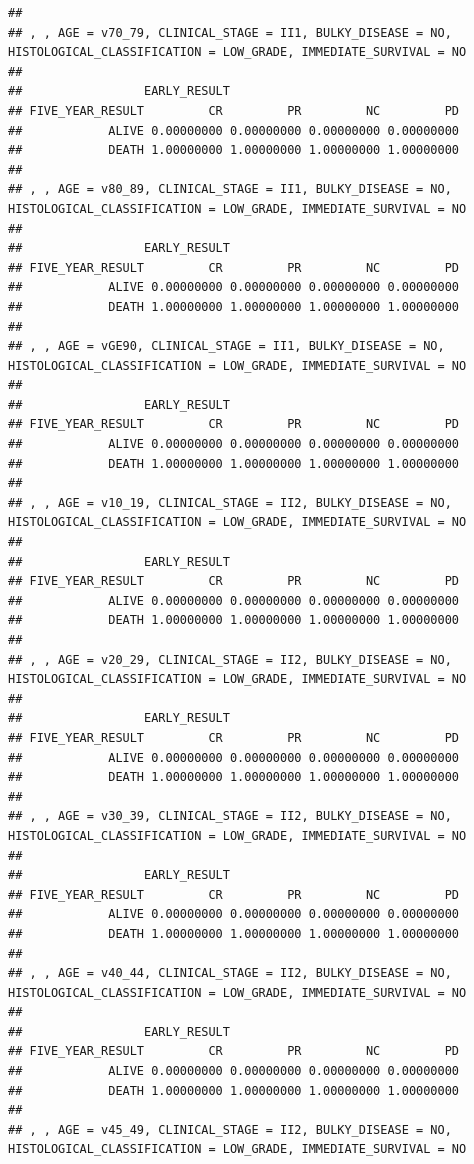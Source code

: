 \documentclass[]{article}
\begin{document}
\begin{verbatim}
## 
## , , AGE = v70_79, CLINICAL_STAGE = II1, BULKY_DISEASE = NO, HISTOLOGICAL_CLASSIFICATION = LOW_GRADE, IMMEDIATE_SURVIVAL = NO
## 
##                 EARLY_RESULT
## FIVE_YEAR_RESULT         CR         PR         NC         PD
##            ALIVE 0.00000000 0.00000000 0.00000000 0.00000000
##            DEATH 1.00000000 1.00000000 1.00000000 1.00000000
## 
## , , AGE = v80_89, CLINICAL_STAGE = II1, BULKY_DISEASE = NO, HISTOLOGICAL_CLASSIFICATION = LOW_GRADE, IMMEDIATE_SURVIVAL = NO
## 
##                 EARLY_RESULT
## FIVE_YEAR_RESULT         CR         PR         NC         PD
##            ALIVE 0.00000000 0.00000000 0.00000000 0.00000000
##            DEATH 1.00000000 1.00000000 1.00000000 1.00000000
## 
## , , AGE = vGE90, CLINICAL_STAGE = II1, BULKY_DISEASE = NO, HISTOLOGICAL_CLASSIFICATION = LOW_GRADE, IMMEDIATE_SURVIVAL = NO
## 
##                 EARLY_RESULT
## FIVE_YEAR_RESULT         CR         PR         NC         PD
##            ALIVE 0.00000000 0.00000000 0.00000000 0.00000000
##            DEATH 1.00000000 1.00000000 1.00000000 1.00000000
## 
## , , AGE = v10_19, CLINICAL_STAGE = II2, BULKY_DISEASE = NO, HISTOLOGICAL_CLASSIFICATION = LOW_GRADE, IMMEDIATE_SURVIVAL = NO
## 
##                 EARLY_RESULT
## FIVE_YEAR_RESULT         CR         PR         NC         PD
##            ALIVE 0.00000000 0.00000000 0.00000000 0.00000000
##            DEATH 1.00000000 1.00000000 1.00000000 1.00000000
## 
## , , AGE = v20_29, CLINICAL_STAGE = II2, BULKY_DISEASE = NO, HISTOLOGICAL_CLASSIFICATION = LOW_GRADE, IMMEDIATE_SURVIVAL = NO
## 
##                 EARLY_RESULT
## FIVE_YEAR_RESULT         CR         PR         NC         PD
##            ALIVE 0.00000000 0.00000000 0.00000000 0.00000000
##            DEATH 1.00000000 1.00000000 1.00000000 1.00000000
## 
## , , AGE = v30_39, CLINICAL_STAGE = II2, BULKY_DISEASE = NO, HISTOLOGICAL_CLASSIFICATION = LOW_GRADE, IMMEDIATE_SURVIVAL = NO
## 
##                 EARLY_RESULT
## FIVE_YEAR_RESULT         CR         PR         NC         PD
##            ALIVE 0.00000000 0.00000000 0.00000000 0.00000000
##            DEATH 1.00000000 1.00000000 1.00000000 1.00000000
## 
## , , AGE = v40_44, CLINICAL_STAGE = II2, BULKY_DISEASE = NO, HISTOLOGICAL_CLASSIFICATION = LOW_GRADE, IMMEDIATE_SURVIVAL = NO
## 
##                 EARLY_RESULT
## FIVE_YEAR_RESULT         CR         PR         NC         PD
##            ALIVE 0.00000000 0.00000000 0.00000000 0.00000000
##            DEATH 1.00000000 1.00000000 1.00000000 1.00000000
## 
## , , AGE = v45_49, CLINICAL_STAGE = II2, BULKY_DISEASE = NO, HISTOLOGICAL_CLASSIFICATION = LOW_GRADE, IMMEDIATE_SURVIVAL = NO

\end{verbatim}
\end{document}
